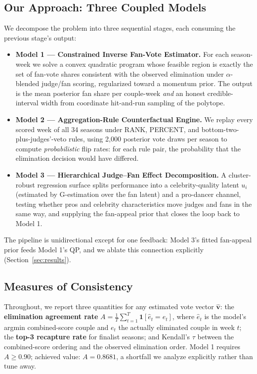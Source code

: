 \documentclass[11pt]{article}
\begin{document}
\subsection{Our Approach: Three Coupled Models}

We decompose the problem into three sequential stages, each consuming the previous stage's output:

\begin{itemize}
\item \textbf{Model 1 --- Constrained Inverse Fan-Vote Estimator.} For each season-week we solve a
convex quadratic program whose feasible region is exactly the set of fan-vote shares consistent
with the observed elimination under $\alpha$-blended judge/fan scoring, regularized toward a
momentum prior. The output is the mean posterior fan share per couple-week \emph{and} an honest
credible-interval width from coordinate hit-and-run sampling of the polytope.
\item \textbf{Model 2 --- Aggregation-Rule Counterfactual Engine.} We replay every scored week of
all 34 seasons under RANK, PERCENT, and bottom-two-plus-judges'-veto rules, using 2,000 posterior
vote draws per season to compute \emph{probabilistic} flip rates: for each rule pair, the
probability that the elimination decision would have differed.
\item \textbf{Model 3 --- Hierarchical Judge--Fan Effect Decomposition.} A cluster-robust
regression surface splits performance into a celebrity-quality latent $u_i$ (estimated by
G-estimation over the fan latent) and a pro-dancer channel, testing whether pros and celebrity
characteristics move judges and fans in the same way, and supplying the fan-appeal prior that
closes the loop back to Model 1.
\end{itemize}

The pipeline is unidirectional except for one feedback: Model 3's fitted fan-appeal prior feeds
Model 1's QP, and we ablate this connection explicitly (Section~\ref{sec:results}).

\subsection{Measures of Consistency}

Throughout, we report three quantities for any estimated vote vector $\hat{\mathbf{v}}$:
the \textbf{elimination agreement rate}
$A = \frac{1}{T}\sum_{t=1}^{T}\mathbf{1}[\hat{e}_t = e_t]$, where $\hat{e}_t$ is the model's
argmin combined-score couple and $e_t$ the actually eliminated couple in week $t$;
the \textbf{top-3 recapture rate} for finalist seasons; and Kendall's $\tau$ between the
combined-score ordering and the observed elimination order. Model 1 requires $A \geq 0.90$;
achieved value: $A = 0.8681$, a shortfall we analyze explicitly rather than tune away.
\end{document}
